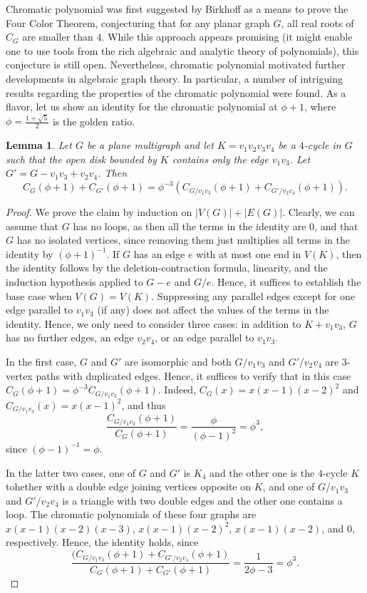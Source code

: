 \documentclass[12pt,twoside,openright,a4paper]{book}
\newtheorem{lemma}[theorem]{Lemma}
\begin{document}
Chromatic polynomial was first suggested by Birkhoff as a means to prove the Four Color Theorem, conjecturing
that for any planar graph $G$, all real roots of $C_G$ are smaller than $4$.  While this approach appears promising
(it might enable one to use tools from the rich algebraic and analytic theory of polynomials),
this conjecture is still open.  Nevertheless, chromatic polynomial motivated further developments in algebraic
graph theory.  In particular, a number of intriguing results regarding the properties of the chromatic polynomial were found.  As a flavor,
let us show an identity for the chromatic polynomial at $\phi+1$, where $\phi=\frac{1+\sqrt{5}}{2}$
is the golden ratio.

\begin{lemma}\label{lemma:tutte}
Let $G$ be a plane multigraph and let $K=v_1v_2v_3v_4$ be a $4$-cycle in $G$ such that the open disk bounded by $K$
contains only the edge $v_1v_3$.  Let $G'=G-v_1v_3+v_2v_4$.  Then
$$C_G(\phi+1)+C_{G'}(\phi+1)=\phi^{-3}(C_{G/v_1v_3}(\phi+1)+C_{G'/v_2v_4}(\phi+1)).$$
\end{lemma}
\begin{proof}
We prove the claim by induction on $|V(G)|+|E(G)|$.  Clearly, we can assume that $G$ has no loops, as then
all the terms in the identity are $0$, and that $G$ has no isolated vertices, since removing them just multiplies all terms
in the identity by $(\phi+1)^{-1}$.
If $G$ has an edge $e$ with at most one end in $V(K)$, then the identity follows by the deletion-contraction formula, linearity,
and the induction hypothesis applied to $G-e$ and $G/e$.  Hence, it suffices to establish the base case when $V(G)=V(K)$.
Suppressing any parallel edges except for one edge parallel to $v_1v_3$ (if any) does not affect the values of the terms in the
identity.  Hence, we only need to consider three cases: in addition to $K+v_1v_3$, $G$ has no further edges, an edge $v_2v_4$, or an edge parallel to $v_1v_3$.

In the first case, $G$ and $G'$ are isomorphic and both $G/v_1v_3$ and $G'/v_2v_4$ are $3$-vertex paths with duplicated edges.
Hence, it suffices to verify that in this case $C_G(\phi+1)=\phi^{-3}C_{G/v_1v_3}(\phi+1)$.  Indeed, $C_G(x)=x(x-1)(x-2)^2$ and
$C_{G/v_1v_3}(x)=x(x-1)^2$, and thus
$$\frac{C_{G/v_1v_3}(\phi+1)}{C_G(\phi+1)}=\frac{\phi}{(\phi-1)^2}=\phi^3,$$
since $(\phi-1)^{-1}=\phi$.

In the latter two cases, one of $G$ and $G'$ is $K_4$ and the other one is the $4$-cycle $K$ tohether with a double edge joining vertices opposite on $K$,
and one of $G/v_1v_3$ and $G'/v_2v_4$ is a triangle with two double edges and the other one contains a loop.
The chromatic polynomials of these four graphs are $x(x-1)(x-2)(x-3)$, $x(x-1)(x-2)^2$, $x(x-1)(x-2)$, and $0$, respectively.  Hence, the identity holds, since
$$\frac{(C_{G/v_1v_3}(\phi+1)+C_{G'/v_2v_4}(\phi+1)}{C_G(\phi+1)+C_{G'}(\phi+1)}=\frac{1}{2\phi-3}=\phi^3.$$
\end{proof}
\end{document}
